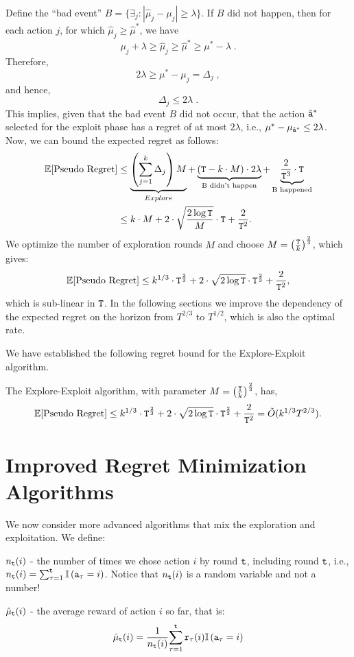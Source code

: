 Define the ``bad event''
$B=\{\exists_{j}:\left|\hat{\mu}_{j}-\mu_{j}\right|\ge\lambda\}$. If
$B$ did not happen, then for each action $j$, for which
$\hat{\mu}_{j}\ge\hat{\mu}^{*}$, we have
\[
\mu_{j}+\lambda\ge\hat{\mu}_{j}\ge\hat{\mu}^{*}\ge\mu^{*}-\lambda\;.
\]
Therefore,
\[
2\lambda\ge\mu^{*}-\mu_{j}=\Delta_{j}\;,
\]
and hence,
\[
\Delta_{j}\le2\lambda\;.
\]
This implies, given that the bad event $B$ did not occur,
that the action $\hat{{\tt a}}^*$ selected for the exploit phase has a regret of at most $2\lambda$, i.e., $\mu^*-\mu_{\hat{{\tt a}}^*}\leq 2\lambda$.
Now, we can bound the expected regret as follows:
\begin{align*}
\mathbb{E}[\text{Pseudo Regret}] & \leq  \underbrace{\left({\displaystyle
\sum_{j=1}^{k}\Delta_{j}}\right)M}_{Explore}+\underbrace{\left({\tt T}-k\cdot
M\right)\cdot2\lambda}_{\text{B didn't
happen}}+\underbrace{\frac{2}{{\tt T}^{3}}\cdot {\tt T}}_{\text{B happened}}\\
 & \leq  k\cdot M+2\cdot\sqrt{\frac{2\log {\tt T}}{M}}\cdot {\tt T}+\frac{2}{{\tt T}^{2}}.
\end{align*}
We optimize the number of exploration rounds $M$ and choose $M=\left(\frac{{\tt T}}{k}\right)^{\frac{2}{3}}$, which gives:
\[
\mathbb{E}[\text{Pseudo Regret}]  \leq 
k^{1/3}\cdot {\tt T}^{\frac{2}{3}}+2\cdot\sqrt{2\log {\tt T}}\cdot
{\tt T}^{\frac{2}{3}}+\frac{2}{{\tt T}^{2}},
\]
which is sub-linear in ${\tt T}$. In the following sections we improve the dependency of the expected  regret on the horizon from $T^{2/3}$ to $T^{1/2}$, which is also the optimal rate.

We have established the following regret bound for the Explore-Exploit algorithm.
\begin{theorem}
    The Explore-Exploit algorithm, with parameter $M=\left(\frac{{\tt T}}{k}\right)^{\frac{2}{3}}$, has,
    \[
\mathbb{E}[\text{Pseudo Regret}]  \leq 
k^{1/3}\cdot {\tt T}^{\frac{2}{3}}+2\cdot\sqrt{2\log {\tt T}}\cdot
{\tt T}^{\frac{2}{3}}+\frac{2}{{\tt T}^{2}}=\Tilde{O} (k^{1/3}T^{2/3}).
\]
\end{theorem}

\section{Improved Regret Minimization Algorithms}

We now consider more advanced algorithms that mix the exploration and exploitation.
We define:
\begin{description}
    \item[] 
$n_{{\tt t}}(i)$ - the number of times we chose action $i$ by round ${\tt t}$, including round ${\tt t}$, i.e., $n_{{\tt t}}(i)=\sum_{\tau=1}^{{\tt t}}\mathbb{I}\left({\tt a}_{\tau}=i\right)$. Notice that $n_{{\tt t}}(i)$ is a random variable and not a number!

\item
$\hat{\mu}_{{\tt t}}(i)$ - the average reward of action $i$ so far, that
is:
\[
\hat{\mu}_{{\tt t}}(i)=\frac{1}{n_{{\tt t}}(i)}{\displaystyle
\sum_{\tau=1}^{{\tt t}}{\tt r}_{\tau}(i)}\mathbb{I}\left({\tt a}_{\tau}=i\right)
\]
\end{description}

